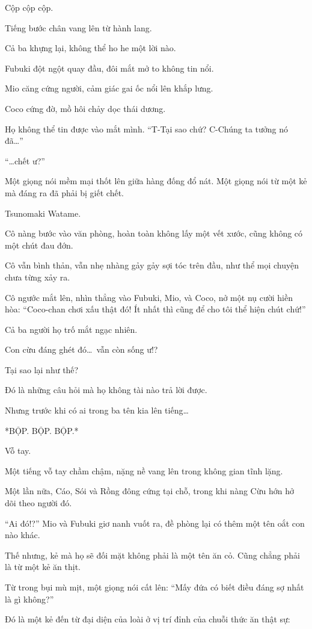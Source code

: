 \documentclass[../main.tex]{subfiles}
\begin{document}
Cộp cộp cộp.

Tiếng bước chân vang lên từ hành lang.

Cả ba khựng lại, không thể ho he một lời nào.

Fubuki đột ngột quay đầu, đôi mắt mở to không tin nổi.

Mio căng cứng người, cảm giác gai ốc nổi lên khắp lưng.

Coco cứng đờ, mồ hôi chảy dọc thái dương.

Họ không thể tin được vào mắt mình. ``T-Tại sao chứ? C-Chúng ta tưởng nó đã\dots''

``\dots chết ư?''

Một giọng nói mềm mại thốt lên giữa hàng đống đổ nát. Một giọng nói từ một kẻ mà đáng ra đã phải bị giết chết.

Tsunomaki Watame.

Cô nàng bước vào văn phòng, hoàn toàn không lấy một vết xước, cũng không có một chút đau đớn.

Cô vẫn bình thản, vẫn nhẹ nhàng gảy gảy sợi tóc trên đầu, như thể mọi chuyện chưa từng xảy ra.

Cô ngước mắt lên, nhìn thẳng vào Fubuki, Mio, và Coco, nở một nụ cười hiền hòa: ``Coco-chan chơi xấu thật đó! Ít nhất thì cũng để cho tôi thể hiện chút chứ!''

Cả ba người họ trố mắt ngạc nhiên.

Con cừu đáng ghét đó\dots\ vẫn còn sống ư!?

Tại sao lại như thế?

Đó là những câu hỏi mà họ không tài nào trả lời được.

Nhưng trước khi có ai trong ba tên kia lên tiếng\dots

*BỘP. BỘP. BỘP.*

Vỗ tay.

Một tiếng vỗ tay chầm chậm, nặng nề vang lên trong không gian tĩnh lặng.

Một lần nữa, Cáo, Sói và Rồng đông cứng tại chỗ, trong khi nàng Cừu hớn hở dõi theo người đó.

``Ai đó!?'' Mio và Fubuki giơ nanh vuốt ra, đề phòng lại có thêm một tên oắt con nào khác.

Thế nhưng, kẻ mà họ sẽ đối mặt không phải là một tên ăn cỏ. Cũng chẳng phải là từ một kẻ ăn thịt.

Từ trong bụi mù mịt, một giọng nói cất lên: ``Mấy đứa có biết điều đáng sợ nhất là gì không?''

Đó là một kẻ đến từ đại diện của loài ở vị trí đỉnh của chuỗi thức ăn thật sự:
\end{document}
